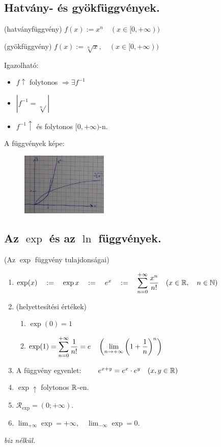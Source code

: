 \documentclass[a4paper,11.5pt]{article}
\begin{document}
	\subsection{Hatvány- és gyökfüggvények.}
	\begin{revision}
		(hatványfüggvény)
		\quad \quad $f(x):=x^n\quad (x\in[0,+\infty))$
	\end{revision}
	\begin{revision}
		(gyökfüggvény)
		\quad \quad $f(x):=\sqrt[n]{x},\quad (x\in[0,+\infty))$
	\end{revision}
	Igazolható:
	\begin{itemize}
		\item $f \uparrow$ folytonos $\Rightarrow\exists f^{-1}$
		\item $\left|f^{-1}=\sqrt[n]{}\right|$
		\item $f^{-1}\uparrow$ és folytonos $[0,+\infty)$-n.
	\end{itemize}
	A függvények képe:
	
	\begin{figure}[H]
		\centering
		\includegraphics[height=3cm]{kepek/03ea_6.jpg}
		\caption{}\label{}
	\end{figure}
	\subsection{Az $\exp$ és az $\ln$ függvények.}
	\begin{theorem}
		(Az $\exp$ függvény tulajdonságai)
		
		\begin{enumerate}
			\item $\exp(x)\quad :=\quad \exp x\quad := \quad e^x\quad :=\quad \displaystyle\sum_{n=0}^{+\infty}\frac{x^n}{n!}\quad (x\in\mathbb{R}, \quad n\in\mathbb{N})$
			\item (helyettesítési értékek)
			\begin{enumerate}
				\item $\exp(0)=1$
				\item $\exp(1)=\displaystyle\sum_{n=0}^{+\infty}\frac{1}{n!}=e\quad \left(\displaystyle\lim_{n\to +\infty}\left(1+\frac{1}{n}\right)^n \right)$
			\end{enumerate}
			\item A függvény egyenlet:
			$\quad \quad  e^{x+y}=e^x\cdot e^y\quad (x,y\in\mathbb{R}) $
			\item $\exp\uparrow$ folytonos $\mathbb{R}$-en.
			\item $\mathcal{R}_{\exp}=(0;+\infty)$.
			\item $\displaystyle \lim_{+\infty}\exp=+\infty,\quad \lim_{-\infty}\exp=0$.
		\end{enumerate}
		\medskip
		
		\textit{biz nélkül.}
	\end{theorem}
	
\end{document}
